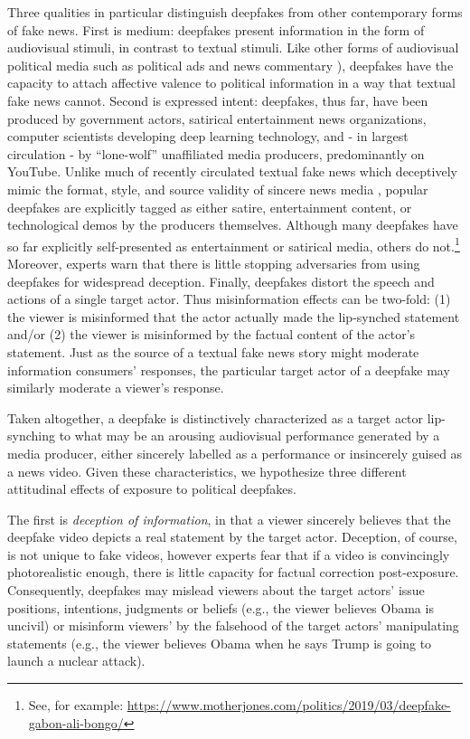 Three qualities in particular distinguish deepfakes from other
contemporary forms of fake news. First is medium: deepfakes present
information in the form of audiovisual stimuli, in contrast to textual
stimuli. Like other forms of audiovisual political media such as
political ads and news commentary \citep{mutz2005, ansolabehere1997}),
deepfakes have the capacity to attach affective valence to political
information in a way that textual fake news cannot. Second is
expressed intent: deepfakes, thus far, have been produced by
government actors, satirical entertainment news organizations,
computer scientists developing deep learning technology, and - in
largest circulation - by “lone-wolf” unaffiliated media producers,
predominantly on YouTube. Unlike much of recently circulated textual
fake news which deceptively mimic the format, style, and source
validity of sincere news media \citep{guess2018, allcott2019}, popular
deepfakes are explicitly tagged as either satire, entertainment
content, or technological demos by the producers themselves. Although
many deepfakes have so far explicitly self-presented as entertainment
or satirical media, others do not.\footnote{See, for
example: \href{https://www.motherjones.com/politics/2019/03/deepfake-gabon-ali-bongo/}{https://www.motherjones.com/politics/2019/03/deepfake-gabon-ali-bongo/}}
Moreover, experts warn that there is little stopping adversaries from
using deepfakes for widespread deception. Finally, deepfakes distort
the speech and actions of a single target actor. Thus misinformation
effects can be two-fold: (1) the viewer is misinformed that the actor
actually made the lip-synched statement and/or (2) the viewer is
misinformed by the factual content of the actor’s statement. Just as
the source of a textual fake news story might moderate information
consumers’ responses, the particular target actor of a deepfake may
similarly moderate a viewer’s response.

Taken altogether, a deepfake is distinctively characterized as a
target actor lip-synching to what may be an arousing audiovisual
performance generated by a media producer, either sincerely labelled
as a performance or insincerely guised as a news video. Given these
characteristics, we hypothesize three different attitudinal effects of
exposure to political deepfakes.

The first is \emph{deception of information}, in that a viewer
sincerely believes that the deepfake video depicts a real statement by
the target actor. Deception, of course, is not unique to fake videos,
however experts fear that if a video is convincingly photorealistic
enough, there is little capacity for factual correction
post-exposure. Consequently, deepfakes may mislead viewers about the
target actors’ issue positions, intentions, judgments or beliefs
(e.g., the viewer believes Obama is uncivil) or misinform viewers’ by
the falsehood of the target actors’ manipulating statements (e.g., the
viewer believes Obama when he says Trump is going to launch a nuclear
attack).

